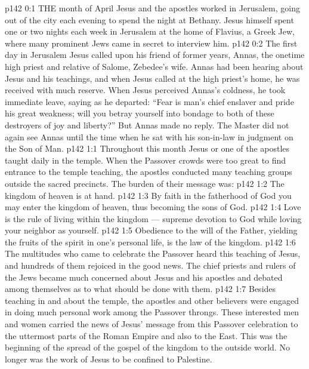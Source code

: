 \vs p142 0:1 THE month of April Jesus and the apostles worked in Jerusalem, going out of the city each evening to spend the night at Bethany. Jesus himself spent one or two nights each week in Jerusalem at the home of Flavius, a Greek Jew, where many prominent Jews came in secret to interview him.
\vs p142 0:2 \pc The first day in Jerusalem Jesus called upon his friend of former years, Annas, the onetime high priest and relative of Salome, Zebedee’s wife. Annas had been hearing about Jesus and his teachings, and when Jesus called at the high priest’s home, he was received with much reserve. When Jesus perceived Annas’s coldness, he took immediate leave, saying as he departed: \textcolor{ubdarkred}{“Fear is man’s chief enslaver and pride his great weakness; will you betray yourself into bondage to both of these destroyers of joy and liberty?”} But Annas made no reply. The Master did not again see Annas until the time when he sat with his son\hyp{}in\hyp{}law in judgment on the Son of Man.
\vs p142 1:1 Throughout this month Jesus or one of the apostles taught daily in the temple. When the Passover crowds were too great to find entrance to the temple teaching, the apostles conducted many teaching groups outside the sacred precincts. The burden of their message was:
\vs p142 1:2 \bibnobreakspace The kingdom of heaven is at hand.
\vs p142 1:3 \bibnobreakspace By faith in the fatherhood of God you may enter the kingdom of heaven, thus becoming the sons of God.
\vs p142 1:4 \bibnobreakspace Love is the rule of living within the kingdom --- supreme devotion to God while loving your neighbor as yourself.
\vs p142 1:5 \bibnobreakspace Obedience to the will of the Father, yielding the fruits of the spirit in one’s personal life, is the law of the kingdom.
\vs p142 1:6 \pc The multitudes who came to celebrate the Passover heard this teaching of Jesus, and hundreds of them rejoiced in the good news. The chief priests and rulers of the Jews became much concerned about Jesus and his apostles and debated among themselves as to what should be done with them.
\vs p142 1:7 Besides teaching in and about the temple, the apostles and other believers were engaged in doing much personal work among the Passover throngs. These interested men and women carried the news of Jesus’ message from this Passover celebration to the uttermost parts of the Roman Empire and also to the East. This was the beginning of the spread of the gospel of the kingdom to the outside world. No longer was the work of Jesus to be confined to Palestine.
